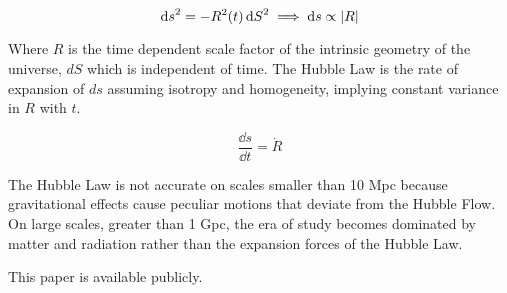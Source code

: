 \documentclass{paper}
\begin{document}
\begin{enumerate}
      \begin{equation}
        \dd{s}^2 = - {R}^2(t)\dd{S}^2 \implies \dd{s} \propto \abs{R}
      \end{equation}

      Where \(R\) is the time dependent scale factor of the intrinsic 
      geometry of the universe, \(dS\) which is independent of time. 
      The Hubble Law is the rate of expansion of \(ds\) assuming isotropy
      and homogeneity, implying constant variance in \(R\) with \(t\).

      \[ \frac{\dd{s}}{\dd{t}} = \dot{R} \]

      The Hubble Law is not accurate on scales smaller than 10 Mpc because 
      gravitational effects cause peculiar motions that deviate from the 
      Hubble Flow. On large scales, greater than 1 Gpc, the era of study
      becomes dominated by matter and radiation rather than the expansion
      forces of the Hubble Law.

\end{enumerate}

This paper is available publicly.\cite{Hayden_Cosmology_Source_Repo}

\pagebreak
\printbibliography
\end{document}
